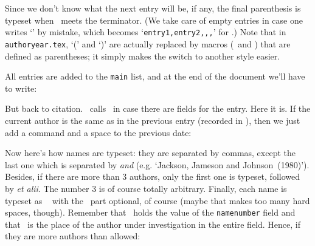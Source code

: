 \noindent Since we don't know what the next entry will be, if any,
the final parenthesis is typeset when \tcmd\readcite\ meets the
terminator. (We take care of empty entries in case one writes
`' by mistake, which becomes
`\texttt{entry1,entry2,,\string\terminator,}' for \tcmd\readcite.)
Note that in \texttt{authoryear.tex}, `(' and `)' are actually
replaced by macros (\tcmd\leftcitemark\ and \tcmd\rightcitemark)
that are defined as parentheses; it simply makes the switch to
another style easier.

All entries are added to the \texttt{main} list, and at the end
of the document we'll have to write:

\verbatim
% Perhaps some \SortDef's?
\endverbatim

But back to citation. \tcmd\readcite\ calls \tcmd\makecitation\
in case there are fields for the entry. Here it is. If the current
author is the same as in the previous entry (recorded in
\tcmd\prevauthor), then we just add a command and a space
to the previous date:

\verbatim
\def\makecitation{%
  \RetrieveFieldIn{name}\temp
  \ifx\temp\prevauthor ,
\endverbatim

\noindent On the other hand, if authors differ (unless the previous
one is empty, which means we're on the first citation), we close
the parenthesis (always added by the next entry to the previous
one, remember?), adds a comma and a space to separate entries,
and typeset the name with \tcmd\ReadName\ (which will make
use of \tcmd\tempcount). We also typeset an opening parenthesis
preceded by a hard space to welcome the upcoming year.

\verbatim
  \else
    \unless\ifx\prevauthor\empty ),\fi
    \RetrieveFieldIn{namenumber}\tempcount
    \ReadName\makecitename~(%
  \fi
\endverbatim

\noindent And in any case we set \tcmd\prevauthor\ to the
current value of \texttt{name}, typeset the year and
add the suffix associated with that entry if it exists
(it is created when we use \tcmd\ReadList), somehow like
the entry number in the previous example.

\verbatim
  \RetrieveFieldIn{name}\prevauthor
  \RetrieveField{year}\csname\EntryKey @suffix\endcsname
  }
\endverbatim

Now here's how names are typeset: they are separated by
commas, except the last one which is separated by \textit{and}
(e.g. `Jackson, Jameson and Johnson~(1980)'). Besides, if there
are more than 3 authors, only the first one is typeset,
followed by \textit{et alii}. The number 3 is of course
totally arbitrary. Finally, each name is typeset as
\texttt{\string\Von\string~\string\Lastname} with the \tcmd\Von\
part optional, of course (maybe that makes too many hard
spaces, though). Remember that \tcmd\tempcount\ holds the value of
the \texttt{namenumber} field and that \tcmd\NameCount\ is
the place of the author under investigation in the entire field.
Hence, if they are more authors than allowed:

